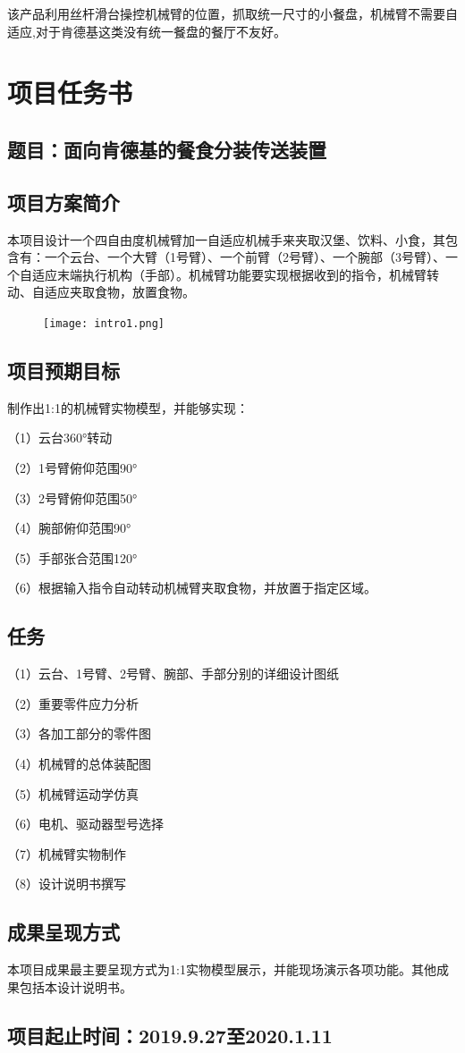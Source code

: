该产品利用丝杆滑台操控机械臂的位置，抓取统一尺寸的小餐盘，机械臂不需要自适应,对于肯德基这类没有统一餐盘的餐厅不友好。





\section{项目任务书}


\subsection{题目：面向肯德基的餐食分装传送装置}

\subsection{项目方案简介}
本项目设计一个四自由度机械臂加一自适应机械手来夹取汉堡、饮料、小食，其包含有：一个云台、一个大臂（1号臂）、一个前臂（2号臂）、一个腕部（3号臂）、一个自适应末端执行机构（手部）。机械臂功能要实现根据收到的指令，机械臂转动、自适应夹取食物，放置食物。

\begin{figure}[h]
  \centering
  \texttt{[image: intro1.png]}
\end{figure}

\subsection{项目预期目标}
制作出1:1的机械臂实物模型，并能够实现：

（1）云台360°转动

（2）1号臂俯仰范围90°

（3）2号臂俯仰范围50°

（4）腕部俯仰范围90°

（5）手部张合范围120°

（6）根据输入指令自动转动机械臂夹取食物，并放置于指定区域。
  


\subsection{任务}

（1）云台、1号臂、2号臂、腕部、手部分别的详细设计图纸

（2）重要零件应力分析

（3）各加工部分的零件图

（4）机械臂的总体装配图

（5）机械臂运动学仿真

（6）电机、驱动器型号选择

（7）机械臂实物制作

（8）设计说明书撰写

\subsection{成果呈现方式}
本项目成果最主要呈现方式为1:1实物模型展示，并能现场演示各项功能。其他成果包括本设计说明书。

\subsection{项目起止时间：2019.9.27至2020.1.11}




